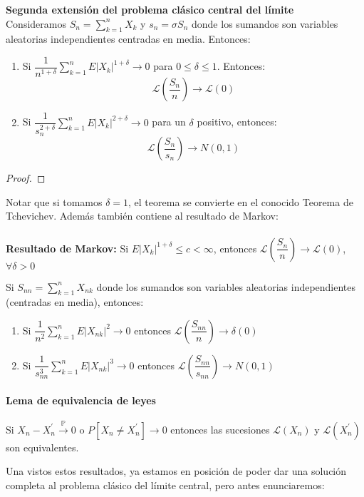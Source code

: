 \begin{theorem} \textbf{Segunda extensión del problema clásico central del límite}\\

Consideramos $S_n=\displaystyle\sum_{k=1}^n X_k$ y $s_n=\sigma S_n$ donde los sumandos son variables aleatorias independientes centradas en media. Entonces:
\begin{enumerate}
\item Si $\dfrac{1}{n^{1+\delta}}\displaystyle\sum_{k=1}^n E|X_k|^{1+\delta}\rightarrow 0$ para $0\leq\delta\leq 1$. Entonces:
$$\mathcal{L}\left( \frac{S_n}{n} \right)\rightarrow \mathcal{L}(0)$$
\item Si $\dfrac{1}{s_n^{2+\delta}}\displaystyle\sum_{k=1}^n E|X_k|^{2+\delta}\rightarrow 0$ para un $\delta$ positivo, entonces:
$$\mathcal{L}\left( \frac{S_n}{s_n} \right)\rightarrow N(0,1)$$
\end{enumerate}
\end{theorem}
\begin{proof}
\end{proof}
Notar que si tomamos $\delta=1$, el teorema se convierte en el conocido Teorema de Tchevichev. Además también contiene al resultado de Markov:
\\\\
\textbf{Resultado de Markov:} Si $E|X_k|^{1+\delta}\leq c < \infty$, entonces $\mathcal{L}\left( \dfrac{S_n}{n} \right)\rightarrow \mathcal{L}(0)$, $\forall \delta >0$
\begin{lemma}
Si $S_{nn}=\displaystyle\sum_{k=1}^n X_{nk}$ donde los sumandos son variables aleatorias independientes (centradas en media), entonces:
\begin{enumerate}
\item Si $\dfrac{1}{n^2}\displaystyle\sum_{k=1}^n E|X_{nk}|^2\rightarrow 0$ entonces $\mathcal{L} \left( \dfrac{S_{nn}}{n} \right)\rightarrow \delta(0)$
\item Si $\dfrac{1}{s_{nn}^3}\displaystyle\sum_{k=1}^n E|X_{nk}|^3\rightarrow 0$ entonces $\mathcal{L} \left( \dfrac{S_{nn}}{s_{nn}} \right)\rightarrow N(0,1)$
\end{enumerate}
\end{lemma}
\paragraph{Lema de equivalencia de leyes}
\begin{lemma}
Si $X_n - X_n ^{\prime}  \stackrel{\mathbb{P}}{\longrightarrow} 0$ o $P[X_n \neq X_n^{\prime}]\longrightarrow 0$ entonces las sucesiones $\mathcal{L}(X_n)$ y $\mathcal{L}(X_n^{\prime})$ son equivalentes.
\end{lemma}
Una vistos estos resultados, ya estamos en posición de poder dar una solución completa al problema clásico del límite central, pero antes enunciaremos:
